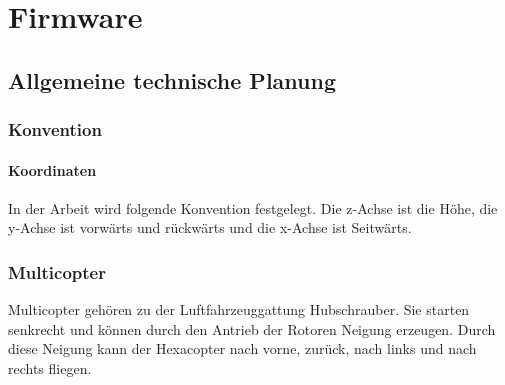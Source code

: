 \chapter{Firmware}
\renewcommand{\kapitelautor}{Autor: Christina Bornberg, Lucas Ullrich}

\section{Allgemeine technische Planung}

  \subsection{Konvention}

    \subsubsection{Koordinaten}
    In der Arbeit wird folgende Konvention festgelegt. Die z-Achse ist die Höhe, die y-Achse ist vorwärts und rückwärts und die x-Achse ist Seitwärts.


  \subsection{Multicopter}
  Multicopter gehören zu der Luftfahrzeuggattung Hubschrauber.
  Sie starten senkrecht und können durch den Antrieb der Rotoren Neigung erzeugen. Durch diese Neigung kann der Hexacopter nach vorne, zurück, nach links und nach rechts fliegen. 

